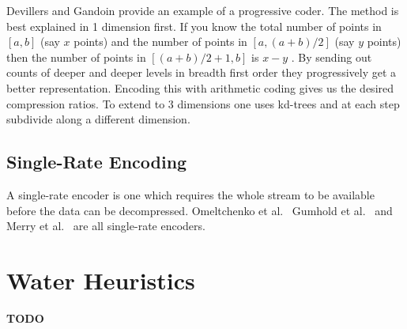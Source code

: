 \documentclass{report}
\begin{document}
Devillers and Gandoin \cite{devillers2000gci} provide an example of a
progressive coder. The method is best explained in 1 dimension first. If you
know the total number of points in $[a, b]$ (say $x$ points) and the number of
points in $[a, (a+b)/2]$ (say $y$ points) then the number of points in
$[(a+b)/2+1, b]$ is $x - y$ . By sending out counts of deeper and deeper
levels in breadth first order they progressively get a better
representation. Encoding this with arithmetic coding gives us the desired
compression ratios. To extend to 3 dimensions one uses kd-trees and at each
step subdivide along a different dimension.


\subsection{Single-Rate Encoding}

A single-rate encoder is one which requires the whole stream to be available
before the data can be decompressed. Omeltchenko et
al.~\cite{omeltchenko2000sls} Gumhold et al.~\cite{gumholdcomp} and Merry et
al.~\cite{merrycomp} are all single-rate encoders.


\section{Water Heuristics}

\textbf{TODO}



\end{document}
